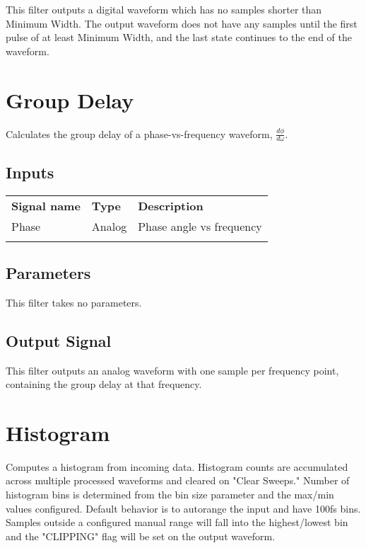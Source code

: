 This filter outputs a digital waveform which has no samples shorter than Minimum Width. The output waveform does not have any samples until the first pulse of at least Minimum Width, and the last state continues to the end of the waveform.

\pagebreak
\section{Group Delay}
\label{filter:groupdelay}

Calculates the group delay of a phase-vs-frequency waveform, $\frac{d\phi}{d\omega}$.

\subsection{Inputs}

\begin{tabularx}{16cm}{llX}
\thickhline
\textbf{Signal name} & \textbf{Type} & \textbf{Description} \\
\thickhline
Phase & Analog & Phase angle vs frequency\\
\thickhline
\end{tabularx}

\subsection{Parameters}

This filter takes no parameters.

\subsection{Output Signal}

This filter outputs an analog waveform with one sample per frequency point, containing the group delay at that
frequency.

\pagebreak
\section{Histogram}
\label{filter:histogram}

Computes a histogram from incoming data. Histogram counts are accumulated across multiple processed waveforms and cleared
on "Clear Sweeps." Number of histogram bins is determined from the bin size parameter and the max/min values configured.
Default behavior is to autorange the input and have 100fs bins. Samples outside a configured manual range will fall into
the highest/lowest bin and the "CLIPPING" flag will be set on the output waveform.

